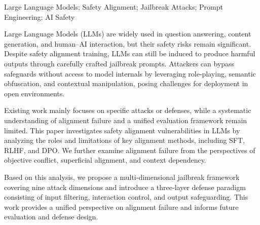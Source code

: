 \begin{enabstract}{Large Language Models; Safety Alignment; Jailbreak Attacks; Prompt Engineering; AI Safety}

Large Language Models (LLMs) are widely used in question answering, content generation, and human–AI interaction, but their safety risks remain significant. Despite safety alignment training, LLMs can still be induced to produce harmful outputs through carefully crafted jailbreak prompts. Attackers can bypass safeguards without access to model internals by leveraging role-playing, semantic obfuscation, and contextual manipulation, posing challenges for deployment in open environments.

Existing work mainly focuses on specific attacks or defenses, while a systematic understanding of alignment failure and a unified evaluation framework remain limited. This paper investigates safety alignment vulnerabilities in LLMs by analyzing the roles and limitations of key alignment methods, including SFT, RLHF, and DPO. We further examine alignment failure from the perspectives of objective conflict, superficial alignment, and context dependency.
    
Based on this analysis, we propose a multi-dimensional jailbreak framework covering nine attack dimensions and introduce a three-layer defense paradigm consisting of input filtering, interaction control, and output safeguarding. This work provides a unified perspective on alignment failure and informs future evaluation and defense design.
\end{enabstract}
\newpage
